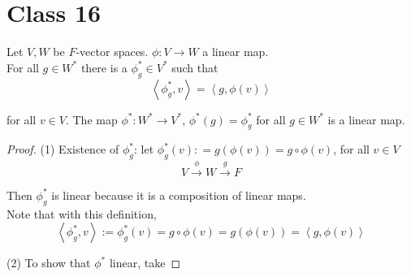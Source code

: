 \section{Class 16}

\begin{proposition}
    Let $V, W$ be $F$-vector spaces. $ \phi: V \to W$ a linear map. \\

    For all $g \in W^*$ there is a $ \phi_g^* \in V^*$ such that 
    \[
        \left< \phi_g^*, v \right> = \left< g, \phi(v) \right>
    \]

    for all $v \in V$. The map $\phi^*: W^* \to V^*$, $\phi^*(g) = \phi_g^*$ for all $g \in W^*$ is a linear map. 
\end{proposition}

\begin{proof}

    (1) Existence of $ \phi_g^*$: let $ \phi_g^*(v): = g( \phi(v)) = g \circ \phi (v)$, for all $v \in V$ 
    \[
        V \overset{ \phi}{\longrightarrow}  W \overset{g}{\longrightarrow}  F
    \]

    Then $ \phi_g^*$ is linear because it is a composition of linear maps.  \\

    Note that with this definition, 
    \[
    \left< \phi_g^*, v \right> := \phi_g^*(v) = g \circ \phi(v) = g \left( \phi(v) \right)  = \left< g, \phi(v) \right>
    \]

    (2) To show that $\phi^*$ linear, take 
    
    
\end{proof}


